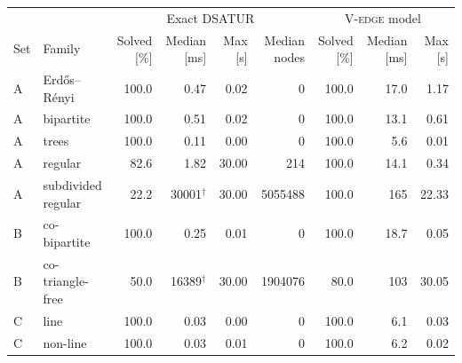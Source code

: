 \begin{tabular}{llrrrrrrr}
\toprule
 & & \multicolumn{4}{c}{Exact DSATUR} & \multicolumn{3}{c}{\textsc{V-edge} model}\\
\cmidrule(lr){3-6}\cmidrule(lr){7-9}
Set & Family & Solved [\%] & Median [ms] & Max [s] & Median nodes & Solved [\%] & Median [ms] & Max [s]\\
\midrule
A & Erd\H{o}s--R\'enyi & 100.0 & 0.47 & 0.02 & 0 & 100.0 & 17.0 & 1.17\\
A & bipartite & 100.0 & 0.51 & 0.02 & 0 & 100.0 & 13.1 & 0.61\\
A & trees & 100.0 & 0.11 & 0.00 & 0 & 100.0 & 5.6 & 0.01\\
A & regular & 82.6 & 1.82 & 30.00 & 214 & 100.0 & 14.1 & 0.34\\
A & subdivided regular & 22.2 & 30001$^{\dagger}$ & 30.00 & 5055488 & 100.0 & 165 & 22.33\\
\midrule
B & co-bipartite & 100.0 & 0.25 & 0.01 & 0 & 100.0 & 18.7 & 0.05\\
B & co-triangle-free & 50.0 & 16389$^{\dagger}$ & 30.00 & 1904076 & 80.0 & 103 & 30.05\\
\midrule
C & line & 100.0 & 0.03 & 0.00 & 0 & 100.0 & 6.1 & 0.03\\
C & non-line & 100.0 & 0.03 & 0.01 & 0 & 100.0 & 6.2 & 0.02\\
\bottomrule
\end{tabular}
